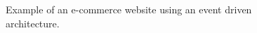 \begin{figure}[]
  \centering
  
  \caption{Example of an e-commerce website using an event driven architecture.}
  \label{fig:event-driven-architecture}
\end{figure}